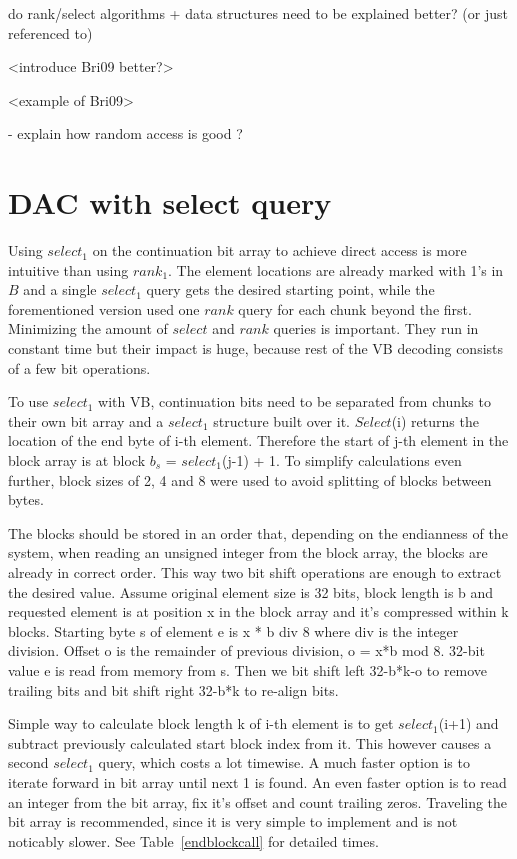 do rank/select algorithms + data structures need to be explained better? (or just referenced to)

<introduce Bri09 better?>

<example of Bri09>

- explain how random access is good ?

\chapter{DAC with select query}

Using $select_1$ on the continuation bit array to achieve direct access is more intuitive than using $rank_1$. The element locations are already marked with 1's 
in $B$ and a single $select_1$ query gets the desired starting point, while the forementioned version \citep{Bri09} used one $rank$ query for each chunk beyond 
the first. Minimizing the amount of $select$ and $rank$ queries is important. They run in constant time but their impact is huge, because rest of the VB decoding 
consists of a few bit operations. 

To use $select_1$ with VB, continuation bits need to be separated from chunks to their own bit array and a $select_1$ structure built over it. $Select$(i) returns the
location of the end byte of i-th element. Therefore the start of j-th element in the block array is at block $b_s$ = $select_1$(j-1) + 1. To simplify calculations even further,
block sizes of 2, 4 and 8 were used to avoid splitting of blocks between bytes.

The blocks should be stored in an order that, depending on the endianness of the system, when reading an unsigned integer from the block array, the blocks are already 
in correct order. This way two bit shift operations are enough to extract the desired value.  Assume original element size is 32 bits, block length is b and requested
element is at position x in the block array and it's compressed within k blocks. Starting byte s of element e is x * b div 8 where div is the integer division. Offset o
is the remainder of previous division, o = x*b mod 8. 32-bit value e is read from memory from s. Then we bit shift left 32-b*k-o to remove trailing bits and bit shift right
32-b*k to re-align bits. 

Simple way to calculate block length k of i-th element is to get $select_1$(i+1) and subtract previously calculated start block index from it. This however causes a second 
$select_1$ query, which costs a lot timewise. A much faster option is to iterate forward in bit array until next 1 is found. An even faster option is to read an integer from 
the bit array, fix it's offset and count trailing zeros. Traveling the bit array is recommended, since it is very simple to implement and is not noticably slower. See 
Table~\ref{endblockcall} for detailed times.

